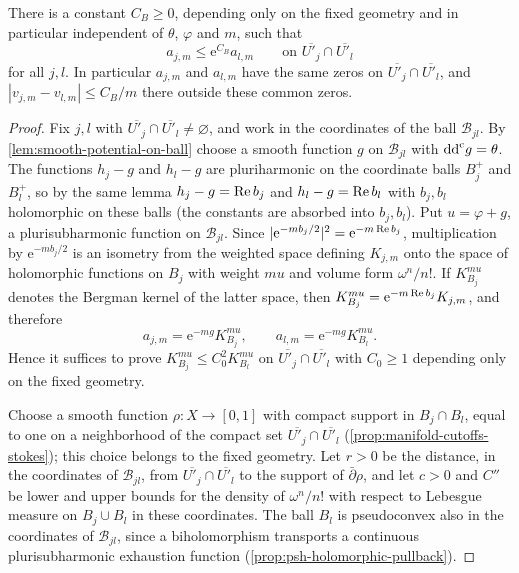 \begin{lemma}\label{lem:geometry-uniform-kernel-overlap}
There is a constant $C_B\geq0$, depending only on the fixed geometry and in particular independent of $\theta$, $\varphi$ and $m$, such that
\[
 a_{j,m}\leq\mathrm e^{C_B}a_{l,m}\qquad\text{on }\overline{U'_j}\cap\overline{U'_l}
\]
for all $j,l$. In particular $a_{j,m}$ and $a_{l,m}$ have the same zeros on $\overline{U'_j}\cap\overline{U'_l}$, and $|v_{j,m}-v_{l,m}|\leq C_B/m$ there outside these common zeros.
\end{lemma}
\begin{proof}
Fix $j,l$ with $\overline{U'_j}\cap\overline{U'_l}\neq\varnothing$, and work in the coordinates of the ball $\mathcal B_{jl}$. By \cref{lem:smooth-potential-on-ball} choose a smooth function $g$ on $\mathcal B_{jl}$ with $\mathrm{dd}^{\mathrm{c}} g=\theta$. The functions $h_j-g$ and $h_l-g$ are pluriharmonic on the coordinate balls $B_j^+$ and $B_l^+$, so by the same lemma $h_j-g=\operatorname{Re} b_j$ and $h_l-g=\operatorname{Re} b_l$ with $b_j,b_l$ holomorphic on these balls (the constants are absorbed into $b_j,b_l$). Put $u=\varphi+g$, a plurisubharmonic function on $\mathcal B_{jl}$. Since $|\mathrm e^{-mb_j/2}|^2=\mathrm e^{-m\operatorname{Re} b_j}$, multiplication by $\mathrm e^{-mb_j/2}$ is an isometry from the weighted space defining $K_{j,m}$ onto the space of holomorphic functions on $B_j$ with weight $mu$ and volume form $\omega^n/n!$. If $K^{mu}_{B_j}$ denotes the Bergman kernel of the latter space, then $K^{mu}_{B_j}=\mathrm e^{-m\operatorname{Re} b_j}K_{j,m}$, and therefore
\[
 a_{j,m}=\mathrm e^{-mg}K^{mu}_{B_j},\qquad a_{l,m}=\mathrm e^{-mg}K^{mu}_{B_l}.
\]
Hence it suffices to prove $K^{mu}_{B_j}\leq C_0^2K^{mu}_{B_l}$ on $\overline{U'_j}\cap\overline{U'_l}$ with $C_0\geq1$ depending only on the fixed geometry.

Choose a smooth function $\rho\colon X\to[0,1]$ with compact support in $B_j\cap B_l$, equal to one on a neighborhood of the compact set $\overline{U'_j}\cap\overline{U'_l}$ (\cref{prop:manifold-cutoffs-stokes}); this choice belongs to the fixed geometry. Let $r>0$ be the distance, in the coordinates of $\mathcal B_{jl}$, from $\overline{U'_j}\cap\overline{U'_l}$ to the support of $\bar\partial\rho$, and let $c>0$ and $C''$ be lower and upper bounds for the density of $\omega^n/n!$ with respect to Lebesgue measure on $B_j\cup B_l$ in these coordinates. The ball $B_l$ is pseudoconvex also in the coordinates of $\mathcal B_{jl}$, since a biholomorphism transports a continuous plurisubharmonic exhaustion function (\cref{prop:psh-holomorphic-pullback}).


\end{proof}
